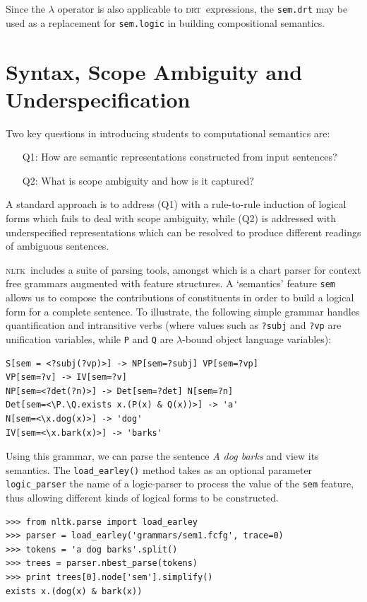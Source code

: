 \documentclass[11pt, a4paper]{article}
\newcommand{\DRT}{\textsc{drt}}
\newcommand{\NLTK}{\textsc{nltk}}
\begin{document}
Since the $\lambda$ operator is also applicable to \DRT\ expressions,
the \texttt{sem.drt} may be used as a replacement for
\texttt{sem.logic} in building compositional semantics.

\section{Syntax, Scope Ambiguity and Underspecification}

Two key questions in introducing students to computational semantics are:
\begin{enumerate}
\item[Q1:] How are semantic representations constructed from input
  sentences?
\vspace{-2ex}
\item[Q2:] What is scope ambiguity and how is it captured?
\end{enumerate}
A standard approach is to address (Q1) with a rule-to-rule induction of
logical forms which fails to deal with scope ambiguity, while (Q2) is
addressed with underspecified representations
which can be resolved to produce different readings of ambiguous
sentences. 

\NLTK\ includes a suite of parsing tools, amongst which is a chart
parser for context free grammars augmented with feature structures. A
`semantics' feature \texttt{sem} allows us to compose the
contributions of constituents in order to build a logical form for a
complete sentence.  To illustrate, the following simple grammar
handles quantification and intransitive verbs (where values such as
\texttt{?subj} and \texttt{?vp} are unification variables, while
\texttt{P} and \texttt{Q} are $\lambda$-bound object language
variables):

\begin{Verbatim}
S[sem = <?subj(?vp)>] -> NP[sem=?subj] VP[sem=?vp]
VP[sem=?v] -> IV[sem=?v]
NP[sem=<?det(?n)>] -> Det[sem=?det] N[sem=?n]
Det[sem=<\P.\Q.exists x.(P(x) & Q(x))>] -> 'a'
N[sem=<\x.dog(x)>] -> 'dog'
IV[sem=<\x.bark(x)>] -> 'barks'
\end{Verbatim}
Using this grammar, we can parse the sentence \textit{A dog barks} and view
its semantics. 
The \texttt{load\_earley()} method
takes as an optional parameter \texttt{logic\_parser} the name of a
logic-parser to process the value of the \texttt{sem} feature, thus
allowing different kinds of logical forms to be constructed.
\begin{Verbatim}
>>> from nltk.parse import load_earley
>>> parser = load_earley('grammars/sem1.fcfg', trace=0)
>>> tokens = 'a dog barks'.split()
>>> trees = parser.nbest_parse(tokens)
>>> print trees[0].node['sem'].simplify()
exists x.(dog(x) & bark(x))
\end{Verbatim}
\end{document}
